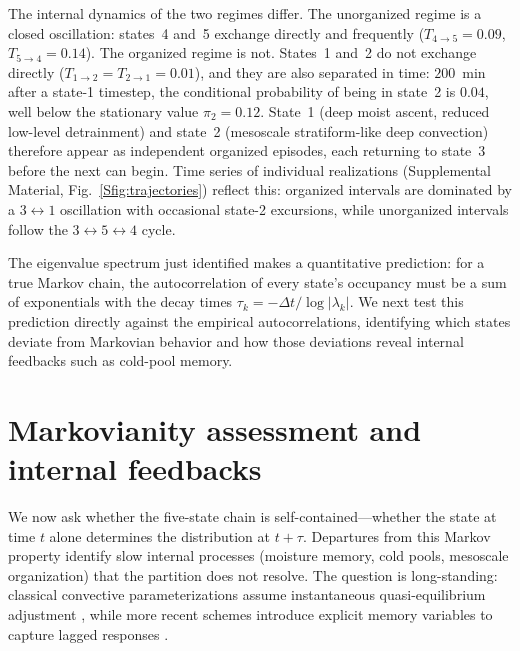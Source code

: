 \documentclass[
    aps,
    prl,
    reprint,
    superscriptaddress,
    amsmath,amssymb,
    floatfix,
    nofootinbib
]{revtex4-2}
\begin{document}
The internal dynamics of the two regimes differ. The unorganized regime is a closed oscillation: states~4 and~5 exchange directly and frequently ($T_{4\to 5}=0.09$, $T_{5\to 4}=0.14$). The organized regime is not. States~1 and~2 do not exchange directly ($T_{1\to 2}=T_{2\to 1}=0.01$), and they are also separated in time: $200$~min after a state-1 timestep, the conditional probability of being in state~2 is $0.04$, well below the stationary value $\pi_2=0.12$. State~1 (deep moist ascent, reduced low-level detrainment) and state~2 (mesoscale stratiform-like deep convection) therefore appear as independent organized episodes, each returning to state~3 before the next can begin. Time series of individual realizations (Supplemental Material, Fig.~\ref{Sfig:trajectories}) reflect this: organized intervals are dominated by a $3\!\leftrightarrow\!1$ oscillation with occasional state-2 excursions, while unorganized intervals follow the $3\!\leftrightarrow\!5\!\leftrightarrow\!4$ cycle.

The eigenvalue spectrum just identified makes a quantitative prediction: for a true Markov chain, the autocorrelation of every state's occupancy must be a sum of exponentials with the decay times $\tau_k = -\Delta t / \log|\lambda_k|$. We next test this prediction directly against the empirical autocorrelations, identifying which states deviate from Markovian behavior and how those deviations reveal internal feedbacks such as cold-pool memory.

\section{Markovianity assessment and internal feedbacks}
\label{sec:markov}

We now ask whether the five-state chain is self-contained---whether the state at time $t$ alone determines the distribution at $t+\tau$. Departures from this Markov property identify slow internal processes (moisture memory, cold pools, mesoscale organization) that the partition does not resolve. The question is long-standing: classical convective parameterizations assume instantaneous quasi-equilibrium adjustment \cite{zhang2003convective, bechtold2014representing}, while more recent schemes introduce explicit memory variables to capture lagged responses \cite{piriou2007approach, gerard2009cloud, mapes2011parameterizing, hwong2023assessing}.
\end{document}
